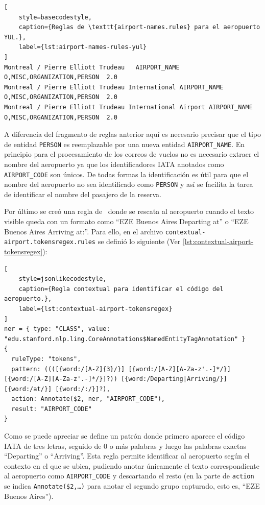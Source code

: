 \begin{lstlisting}[
    style=basecodestyle,
    caption={Reglas de \texttt{airport-names.rules} para el aeropuerto YUL.},
    label={lst:airport-names-rules-yul}
]
Montreal / Pierre Elliott Trudeau	AIRPORT_NAME	O,MISC,ORGANIZATION,PERSON	2.0
Montreal / Pierre Elliott Trudeau International	AIRPORT_NAME	O,MISC,ORGANIZATION,PERSON	2.0
Montreal / Pierre Elliott Trudeau International Airport	AIRPORT_NAME	O,MISC,ORGANIZATION,PERSON	2.0
\end{lstlisting}

A diferencia del fragmento de reglas anterior aquí es necesario precisar que el tipo de entidad \texttt{PERSON} es
reemplazable por una nueva entidad \texttt{AIRPORT\_NAME}.
En principio para el procesamiento de los correos de vuelos no es necesario extraer el nombre del aeropuerto ya que los
identificadores IATA anotados como \texttt{AIRPORT\_CODE} son únicos.
De todas formas la identificación es útil para que el nombre del aeropuerto no sea identificado como \texttt{PERSON} y
así se facilita la tarea de identificar el nombre del pasajero de la reserva.

Por último se creó una regla de~\cite{stanford-tokensregex} donde se
rescata al aeropuerto cuando el texto visible queda con un formato como \enquote{EZE Buenos Aires Departing at} o
\enquote{EZE Buenos Aires Arriving at:}.
Para ello, en el archivo \nolinkurl{contextual-airport.tokensregex.rules} se definió lo siguiente
(Ver \autoref{lst:contextual-airport-tokensregex}):

\begin{lstlisting}[
    style=jsonlikecodestyle,
    caption={Regla contextual para identificar el código del aeropuerto.},
    label={lst:contextual-airport-tokensregex}
]
ner = { type: "CLASS", value: "edu.stanford.nlp.ling.CoreAnnotations$NamedEntityTagAnnotation" }
{
  ruleType: "tokens",
  pattern: ((([{word:/[A-Z]{3}/}] [{word:/[A-Z][A-Za-z'.-]*/}] [{word:/[A-Z][A-Za-z'.-]*/}]?)) [{word:/Departing|Arriving/}] [{word:/at/}] [{word:/:/}]?),
  action: Annotate($2, ner, "AIRPORT_CODE"),
  result: "AIRPORT_CODE"
}
\end{lstlisting}

Como se puede apreciar se define un patrón donde primero aparece el código IATA de tres letras, seguido de 0 o más
palabras y luego las palabras exactas ``Departing'' o ``Arriving''.
Esta regla permite identificar al aeropuerto según el contexto en el que se ubica, pudiendo anotar únicamente el texto
correspondiente al aeropuerto como \texttt{AIRPORT\_CODE} y descartando el resto (en la parte de \texttt{action} se
indica \texttt{Annotate\string(\$2,\ldots\string)} para anotar el segundo grupo capturado, esto es,
\enquote{EZE Buenos Aires}).

